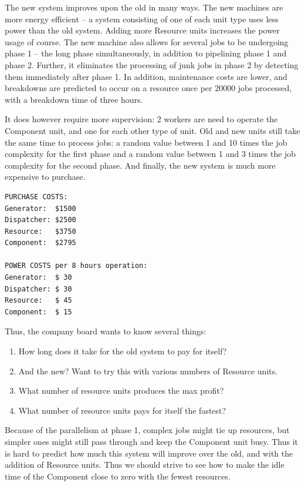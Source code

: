 \documentclass[10pt]{article}
\begin{document}
The new system improves upon the old in many ways.  The new machines are more
energy efficient -- a system consisting of one of each unit type uses less
power than the old system.  Adding more Resource units increases the power
usage of course.  The new machine also allows for several jobs to be
undergoing phase 1 -- the long phase simultaneously, in addition to pipelining
phase 1 and phase 2.  Further, it eliminates the processing of junk jobs in
phase 2 by detecting them immediately after phase 1.  In addition, maintenance
costs are lower, and breakdowns are predicted to occur on a resource once per
20000 jobs processed, with a breakdown time of three hours.  

It does however require more supervision: 2 workers are need to
operate the Component unit, and one for each other type of unit. Old
and new units still take the same time to process jobs: a random value
between 1 and 10 times the job complexity for the first phase and a
random value between 1 and 3 times the job complexity for the second
phase. And finally, the new system is much more expensive to purchase.

\begin{verbatim}
PURCHASE COSTS:
Generator:  $1500 
Dispatcher: $2500
Resource:   $3750
Component:  $2795

POWER COSTS per 8 hours operation:
Generator:  $ 30 
Dispatcher: $ 30
Resource:   $ 45
Component:  $ 15
\end{verbatim}

Thus, the company board wants to know several things:

\begin{enumerate}
\item How long does it take for the old system to pay for itself?
\item And the new?  Want to try this with various numbers of Resource units.
\item What number of resource units produces the max profit?
\item What number of resource units pays for itself the fastest?
\end{enumerate}

Because of the parallelism at phase 1, complex jobs might tie up resources,
but simpler ones might still pass through and keep the Component unit
busy. Thus it is hard to predict how much this system will improve over the
old, and with the addition of Resource units.  Thus we should strive to see
how to make the idle time of the Component close to zero with the fewest
resources. 
\end{document}
